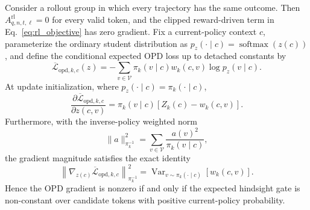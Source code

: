 \begin{proposition}
\label{prop:dense_credit}
Consider a rollout group in which every trajectory has the same outcome. Then
$A^{\mathrm{rl}}_{q,n,t,\ell}=0$
for every valid token, and the clipped reward-driven term in Eq.~\ref{eq:rl_objective} has zero gradient. Fix a current-policy context $c$, parameterize the ordinary student distribution as
$p_z(\cdot\mid c)=\operatorname{softmax}(z(c))$,
and define the conditional expected OPD loss up to detached constants by
\begin{equation}
 \overline{\mathcal L}_{\mathrm{opd},k,c}(z)
 =
 -\sum_{v\in\mathcal V}
 \pi_k(v\mid c)w_k(c,v)
 \log p_z(v\mid c).
 \label{eq:conditional_opd_loss}
\end{equation}
At update initialization, where $p_z(\cdot\mid c)=\pi_k(\cdot\mid c)$,
\begin{equation}
 \frac{\partial
 \overline{\mathcal L}_{\mathrm{opd},k,c}}
 {\partial z(c,v)}
 =
 \pi_k(v\mid c)
 \left[Z_k(c)-w_k(c,v)\right].
 \label{eq:dense_credit_gradient}
\end{equation}
Furthermore, with the inverse-policy weighted norm
\[
 \|a\|^2_{\pi_k^{-1}}
 =
 \sum_{v\in\mathcal V}
 \frac{a(v)^2}{\pi_k(v\mid c)},
\]
the gradient magnitude satisfies the exact identity
\begin{equation}
 \left\|
 \nabla_{z(c)}
 \overline{\mathcal L}_{\mathrm{opd},k,c}
 \right\|^2_{\pi_k^{-1}}
 =
 \operatorname{Var}_{v\sim\pi_k(\cdot\mid c)}
 \left[w_k(c,v)\right].
 \label{eq:gate_variance_identity}
\end{equation}
Hence the OPD gradient is nonzero if and only if the expected hindsight gate is non-constant over candidate tokens with positive current-policy probability.
\end{proposition}

